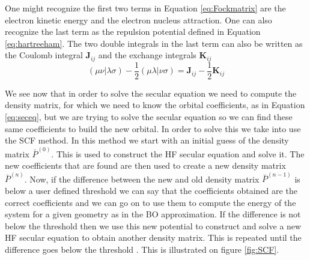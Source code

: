 \documentclass[../master_thesis.tex]{subfiles}
\begin{document}
One might recognize the first two terms in  Equation \ref{eq:Fockmatrix} are
the electron kinetic energy and the electron nucleus attraction. One can also recognize the
last term as the repulsion potential defined in Equation \ref{eq:hartreeham}.
The two double integrals in the last term can also be written as the Coulomb integral $\mathbf{J}_{ij}$
and the exchange integrals $\mathbf{K}_{ij}$ \cite{Cramer:2004}
\begin{equation}
  (\mu\nu|\lambda\sigma) - \frac{1}{2}(\mu\lambda|\nu\sigma) = \mathbf{J}_{ij} - \frac{1}{2}\mathbf{K}_{ij}
\end{equation}

We see now that in order to solve the secular equation we need to compute the
density matrix, for which we need to know the orbital coefficients, as in Equation
\ref{eq:seceq}, but we  are trying to solve the secular equation so we can find
these same coefficients to build the new orbital.
In order to solve this we take into use the \ac{SCF} method. In this method
we start with an initial guess of the density matrix $\bar{P}^{(0)}$. This
is used to construct the \ac{HF} secular equation and solve it. The new coefficients
that are found are then used to create a new density matrix $\bar{P}^(n)$. Now, if
the difference between the new and old density matrix $ \bar{P}^(n-1)$ is below
a user defined threshold we can say that the coefficients obtained are the correct
coefficients and we can go on to use them to compute the energy of the system for
a given geometry as in the \ac{BO} approximation. If the difference
is not below the threshold then we use this new potential to construct and solve
a new \ac{HF} secular equation to obtain another density matrix. This is repeated
until the difference goes below the threshold \cite{Helgaker:2012, Cramer:2004}.
This is illustrated on figure \ref{fig:SCF}.
\end{document}
